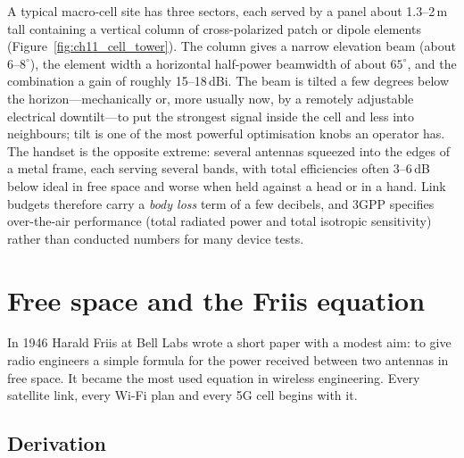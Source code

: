 
\begin{inpractice}
A typical macro-cell site has three sectors, each served by a panel about 1.3--2\,m tall
containing a vertical column of cross-polarized patch or dipole elements
(Figure~\ref{fig:ch11_cell_tower}). The column gives a
narrow elevation beam (about $6$--$8^\circ$), the element width a horizontal half-power
beamwidth of about $65^\circ$, and the combination a gain of roughly 15--18\,dBi. The beam is
tilted a few degrees below the horizon---mechanically or, more usually now, by a remotely
adjustable electrical downtilt---to put the strongest signal inside the cell and less into
neighbours; tilt is one of the most powerful optimisation knobs an operator has. The handset
is the opposite extreme: several antennas squeezed into the edges of a metal frame, each
serving several bands, with total efficiencies often 3--6\,dB below ideal in free space and
worse when held against a head or in a hand. Link budgets therefore carry a \emph{body loss}
term of a few decibels, and 3GPP specifies over-the-air performance (total radiated power and
total isotropic sensitivity) rather than conducted numbers for many device tests.
\end{inpractice}

\section{Free space and the Friis equation}
\label{sec:ch11:friis}

In 1946 Harald Friis at Bell Labs wrote a short paper with a modest aim: to give radio engineers
a simple formula for the power received between two antennas in free space. It became the most
used equation in wireless engineering. Every satellite link, every Wi-Fi plan and every 5G cell
begins with it.

\subsection{Derivation}

